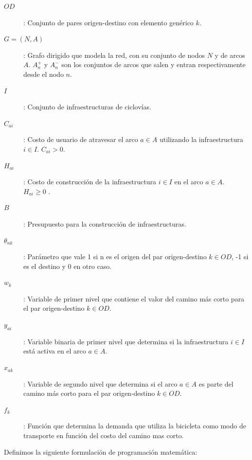 \documentclass{article}
\begin{document}
  \begin{description}
    \item[$OD$]: Conjunto de pares origen-destino con elemento genérico $k$.
    \item[$G=(N,A)$]: Grafo dirigido que modela la red, con su conjunto de nodos $N$ y de arcos $A$. $A_n^+$ y $A_n^-$ son los conjuntos de arcos que salen y entran respectivamente desde el nodo $n$.
    \item[$I$]: Conjunto de infraestructuras de ciclovías.
    \item[$C_{ai}$]: Costo de usuario de atravesar el arco $a \in A$ utilizando la infraestructura $i \in I$. $C_{ai} > 0$.
    \item[$H_{ai}$]: Costo de construcción de la infraestructura $i \in I$ en el arco $a \in A$. $H_{ai} \geq 0$ .
    \item[$B$]: Presupuesto para la construcción de infraestructuras.
    \item[$\theta_{nk}$]: Parámetro que vale 1 si n es el origen del par origen-destino $k \in OD$, -1 si es el destino y 0 en otro caso.
    \item[$w_k$]: Variable de primer nivel que contiene el valor del camino más corto para el par origen-destino $k \in OD$.
    \item[$y_{ai}$]: Variable binaria de primer nivel que determina si la infraestructura $i \in I$ está activa en el arco $a \in A$.
    \item[$x_{ak}$]: Variable de segundo nivel que determina si el arco $a \in A$ es parte del camino más corto para el par origen-destino $k \in OD$.
    \item[$f_k$]: Función que determina la demanda que utiliza la bicicleta como modo de transporte en función del costo del camino mas corto.
  \end{description}

  Definimos la siguiente formulación de programación matemática:
\end{document}
